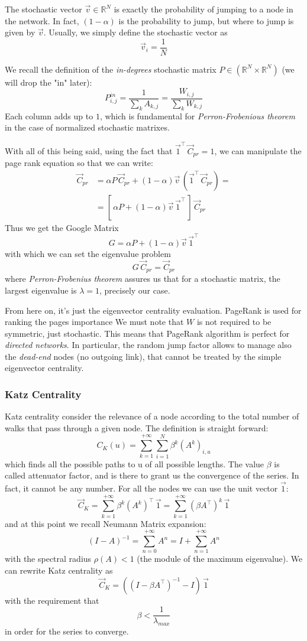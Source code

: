 \documentclass[12pt,a4paper]{article}
\begin{document}
The stochastic vector $\vec{v} \in \mathbb{R}^N$ is exactly the probability of jumping to a node in the network. In fact, $(1-\alpha)$ is the probability to jump, but where to jump is given by $\vec{v}$. Usually, we simply define the stochastic vector as
$$
\vec{v}_i = \frac{1}{N}
$$

We recall the definition of the \textit{in-degrees} stochastic matrix $P \in (\mathbb{R}^N\times \mathbb{R}^N)$ (we will drop the "in" later):
$$
P^{in}_{i,j} = \frac{1}{\sum_{k} A_{k,j}} = \frac{W_{i,j}}{\sum_{k} W_{k,j}}
$$
Each column adds up to $1$, which is fundamental for \textit{Perron-Frobenious theorem} in the case of normalized stochastic matrixes.

With all of this being said, using the fact that $\vec{1}^\intercal \, \vec{C}_{pr} = 1$, we can manipulate the page rank equation so that we can write:
\begin{align*}
\vec{C}_{pr} &= \alpha P \, \vec{C}_{pr} + (1-\alpha)\vec{v} \, (\vec{1}^\intercal \, \vec{C}_{pr}) = \\[1em]
&= [\, \alpha P + (1-\alpha)\vec{v} \, \vec{1}^\intercal \,] \, \vec{C}_{pr}
\end{align*}
Thus we get the Google Matrix
$$
G = \alpha P + (1-\alpha)\vec{v} \, \vec{1}^\intercal
$$
with which we can set the eigenvalue problem
$$
G\,\vec{C}_{pr} = \vec{C}_{pr}
$$
where \textit{Perron-Frobenius theorem} assures us that for a stochastic matrix, the largest eigenvalue is $\lambda = 1$, precisely our case.

From here on, it's just the eigenvector centrality evaluation. PageRank is used for ranking the pages importance
We must note that $W$ is not required to be symmetric, just stochastic. This means that PageRank algorithm is perfect for \textit{directed networks}. In particular, the random jump factor allows to manage also the \textit{dead-end} nodes (no outgoing link), that cannot be treated by the simple eigenvector centrality.


\subsubsection*{Katz Centrality}
Katz centrality consider the relevance of a node according to the total number of walks that pass through a given node.
The definition is straight forward:
$$
C_{K}(u) = \sum_{k=1}^{+\infty} \sum_{i=1}^N \beta^k (A^k)_{i,u}
$$
which finds all the possible paths to u of all possible lengths. The value $\beta$ is called attenuator factor, and is there to grant us the convergence of the series. In fact, it cannot be any number. For all the nodes we can use the unit vector $\vec{1}$:
$$
\vec{C}_{K} = \sum_{k=1}^{+\infty} \beta^k (A^k)^\intercal \, \vec{1} = \sum_{k=1}^{+\infty} (\beta A^\intercal)^k \, \vec{1}
$$
and at this point we recall Neumann Matrix expansion:
$$
(I-A)^{-1} = \sum_{n=0}^{+\infty} A^n = I + \sum_{n=1}^{+\infty} A^n
$$
with the spectral radius $\rho (A)<1$ (the module of the maximum eigenvalue).
We can rewrite Katz centrality as
$$
\vec{C}_{K} = ((I-\beta A^\intercal)^{-1}-I)\, \vec{1}
$$
with the requirement that
$$
\beta < \frac{1}{\lambda_{max}}
$$
in order for the series to converge.
\end{document}
